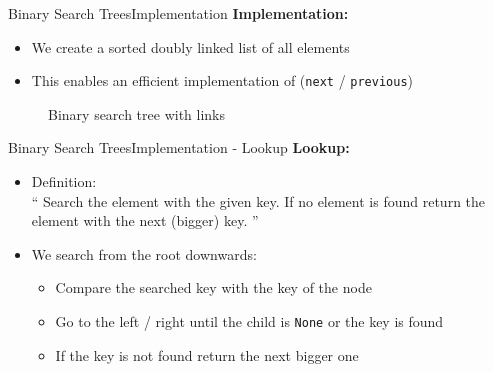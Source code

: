 \begin{frame}{Binary Search Trees}{Implementation}
  \textbf{Implementation:}
  \begin{itemize}
    \item<2->
      We create a sorted doubly linked list of all elements
    \item<3->
      This enables an efficient implementation of
      (\texttt{\color{Mittel-Blau}next} /
      \texttt{\color{Mittel-Blau}previous})
  \end{itemize}
  \begin{figure}
    
    \caption{Binary search tree with links}
    \label{fig:binary_search_trees:binary_tree_impl2}
  \end{figure}
\end{frame}


\begin{frame}{Binary Search Trees}{Implementation - Lookup}
  \textbf{Lookup:}
  \begin{itemize}
    \item<2->
      Definition:\\
      \enquote{
        Search the element with the given key.
        If no element is found return the element with the next (bigger) key.
      }
    \item<3->
      We search from the root downwards:
      \begin{itemize}
        \item<4->
          Compare the searched key with the key of the node
        \item<5->
          Go to the left / right until the child is
          \texttt{\color{Mittel-Blau}None} or the key is found
        \item<6->
          If the key is not found return the next bigger one
      \end{itemize}
  \end{itemize}
\end{frame}


